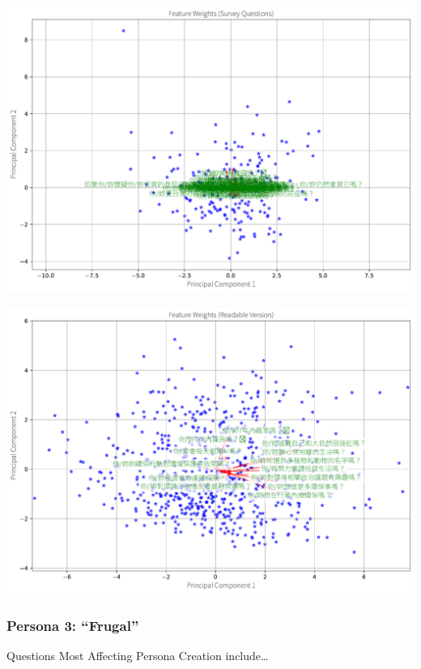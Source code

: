 \documentclass[
  letterpaper,
  DIV=11,
  numbers=noendperiod]{scrartcl}
\begin{document}
\includegraphics{_thesis_files/figure-pdf/cell-85-output-3.pdf}

\includegraphics{_thesis_files/figure-pdf/cell-85-output-4.pdf}

\subsubsection{Persona 3: ``Frugal''}\label{persona-3-frugal}

Questions Most Affecting Persona Creation include\ldots{}
\end{document}
